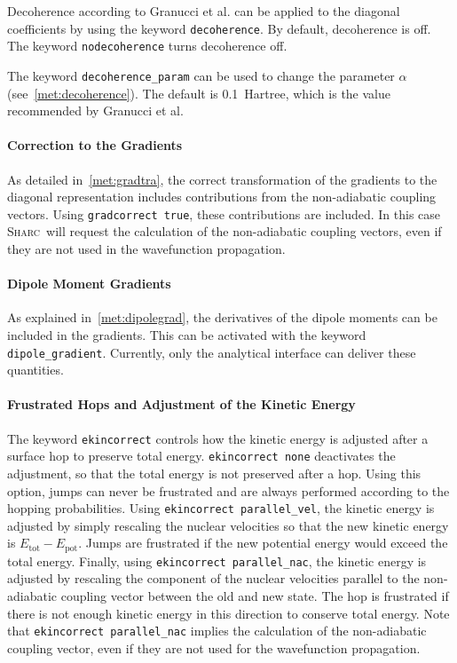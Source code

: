 \documentclass[a4paper,11pt,DIV=15,openany,twoside=false]{scrbook}
\newcommand{\sharc}{\textsc{Sharc}}
\newcommand{\ttt}[1]{\texttt{#1}}
\begin{document}
Decoherence according to Granucci et al.\cite{Granucci2010JCP} can be applied to the diagonal coefficients by using the keyword \ttt{decoherence}. By default, decoherence is off. The keyword \ttt{nodecoherence} turns decoherence off. 

The keyword \ttt{decoherence\_param} can be used to change the parameter $\alpha$ (see~\ref{met:decoherence}). The default is 0.1~Hartree, which is the value recommended by Granucci et al.

\paragraph{Correction to the Gradients}

As detailed in~\ref{met:gradtra}, the correct transformation of the gradients to the diagonal representation includes contributions from the non-adiabatic coupling vectors. Using \ttt{gradcorrect true}, these contributions are included. In this case \sharc\ will request the calculation of the non-adiabatic coupling vectors, even if they are not used in the wavefunction propagation. 

\paragraph{Dipole Moment Gradients}

As explained in~\ref{met:dipolegrad}, the derivatives of the dipole moments can be included in the gradients. This can be activated with the keyword \ttt{dipole\_gradient}. Currently, only the analytical interface can deliver these quantities.

\paragraph{Frustrated Hops and Adjustment of the Kinetic Energy}

The keyword \ttt{ekincorrect} controls how the kinetic energy is adjusted after a surface hop to preserve total energy. \ttt{ekincorrect none} deactivates the adjustment, so that the total energy is not preserved after a hop. Using this option, jumps can never be frustrated and are always performed according to the hopping probabilities. 
Using \ttt{ekincorrect parallel\_vel}, the kinetic energy is adjusted by simply rescaling the nuclear velocities so that the new kinetic energy is $E_{\text{tot}}-E_{\text{pot}}$. Jumps are frustrated if the new potential energy would exceed the total energy.
Finally, using \ttt{ekincorrect parallel\_nac}, the kinetic energy is adjusted by rescaling the component of the nuclear velocities parallel to the non-adiabatic coupling vector between the old and new state. The hop is frustrated if there is not enough kinetic energy in this direction to conserve total energy. Note that \ttt{ekincorrect parallel\_nac} implies the calculation of the non-adiabatic coupling vector, even if they are not used for the wavefunction propagation.
\end{document}
